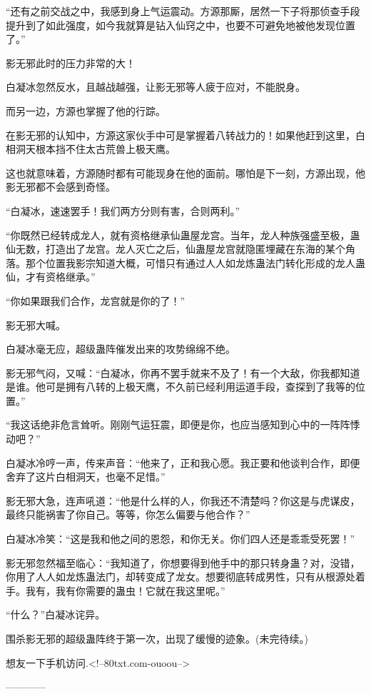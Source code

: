 \begin{this_body}
“还有之前交战之中，我感到身上气运震动。方源那厮，居然一下子将那侦查手段提升到了如此强度，如今我就算是钻入仙窍之中，也要不可避免地被他发现位置了。”

影无邪此时的压力非常的大！

白凝冰忽然反水，且越战越强，让影无邪等人疲于应对，不能脱身。

而另一边，方源也掌握了他的行踪。

在影无邪的认知中，方源这家伙手中可是掌握着八转战力的！如果他赶到这里，白相洞天根本挡不住太古荒兽上极天鹰。

这也就意味着，方源随时都有可能现身在他的面前。哪怕是下一刻，方源出现，他影无邪都不会感到奇怪。

“白凝冰，速速罢手！我们两方分则有害，合则两利。”

“你既然已经转成龙人，就有资格继承仙蛊屋龙宫。当年，龙人种族强盛至极，蛊仙无数，打造出了龙宫。龙人灭亡之后，仙蛊屋龙宫就隐匿埋藏在东海的某个角落。那个位置我影宗知道大概，可惜只有通过人人如龙炼蛊法门转化形成的龙人蛊仙，才有资格继承。”

“你如果跟我们合作，龙宫就是你的了！”

影无邪大喊。

白凝冰毫无应，超级蛊阵催发出来的攻势绵绵不绝。

影无邪气闷，又喊：“白凝冰，你再不罢手就来不及了！有一个大敌，你我都知道是谁。他可是拥有八转的上极天鹰，不久前已经利用运道手段，查探到了我等的位置。”

“我这话绝非危言耸听。刚刚气运狂震，即便是你，也应当感知到心中的一阵阵悸动吧？”

白凝冰冷哼一声，传来声音：“他来了，正和我心愿。我正要和他谈判合作，即便舍弃了这片白相洞天，也毫不足惜。”

影无邪大急，连声吼道：“他是什么样的人，你我还不清楚吗？你这是与虎谋皮，最终只能祸害了你自己。等等，你怎么偏要与他合作？”

白凝冰冷笑：“这是我和他之间的恩怨，和你无关。你们四人还是乖乖受死罢！”

影无邪忽然福至临心：“我知道了，你想要得到他手中的那只转身蛊？对，没错，你用了人人如龙炼蛊法门，却转变成了龙女。想要彻底转成男性，只有从根源处着手。我有，我有你需要的蛊虫！它就在我这里呢。”

“什么？”白凝冰诧异。

围杀影无邪的超级蛊阵终于第一次，出现了缓慢的迹象。(未完待续。)

想友一下手机访问.<!--80txt.com-ouoou-->

------------

\end{this_body}

